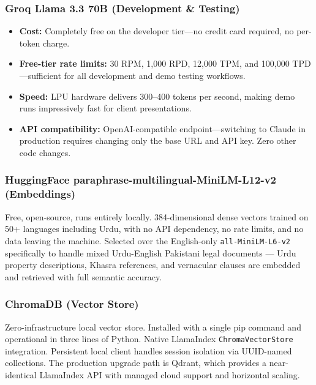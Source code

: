 \documentclass[12pt, a4paper]{article}
\begin{document}
\subsubsection{Groq Llama 3.3 70B (Development \& Testing)}

\begin{itemize}[leftmargin=1.5cm]
    \item \textbf{Cost:} Completely free on the developer tier---no credit card
    required, no per-token charge.
    \item \textbf{Free-tier rate limits:} 30 RPM, 1,000 RPD, 12,000 TPM, and
    100,000 TPD---sufficient for all development and demo testing workflows.
    \item \textbf{Speed:} LPU hardware delivers 300--400 tokens per second,
    making demo runs impressively fast for client presentations.
    \item \textbf{API compatibility:} OpenAI-compatible endpoint---switching to
    Claude in production requires changing only the base URL and API key. Zero
    other code changes.
\end{itemize}

\subsubsection{HuggingFace paraphrase-multilingual-MiniLM-L12-v2 (Embeddings)}

Free, open-source, runs entirely locally. 384-dimensional dense vectors trained
on 50+ languages including Urdu, with no API dependency, no rate limits, and no
data leaving the machine. Selected over the English-only
\texttt{all-MiniLM-L6-v2} specifically to handle mixed Urdu-English Pakistani
legal documents --- Urdu property descriptions, Khasra references, and
vernacular clauses are embedded and retrieved with full semantic accuracy.

\subsubsection{ChromaDB (Vector Store)}

Zero-infrastructure local vector store. Installed with a single pip command and
operational in three lines of Python. Native LlamaIndex \texttt{ChromaVectorStore}
integration. Persistent local client handles session isolation via UUID-named
collections. The production upgrade path is Qdrant, which provides a near-identical
LlamaIndex API with managed cloud support and horizontal scaling.
\end{document}
